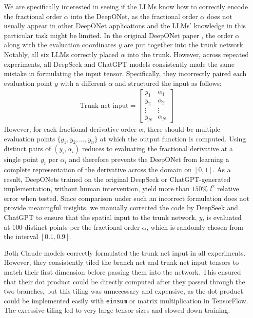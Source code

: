 \documentclass{article}
\begin{document}
We are specifically interested in seeing if the LLMs know how to correctly encode the fractional order $\alpha$ into the DeepONet, as the fractional order $\alpha$ does not usually appear in other DeepONet applications and the LLMs' knowledge in this particular task might be limited. In the original DeepONet paper \cite{deeponet}, the order $\alpha$ along with the evaluation coordinates $y$ are put together into the trunk network. Notably, all six LLMs correctly placed $\alpha$ into the trunk. However, across repeated experiments, all DeepSeek and ChatGPT models consistently made the same mistake in formulating the input tensor. Specifically, they incorrectly paired each evaluation point $y$ with a different $\alpha$ and structured the input as follows:  
\begin{align*}
    \text{Trunk net input} = \begin{bmatrix} 
    y_1 & \alpha_1 \\ 
    y_2 & \alpha_2 \\ 
    \vdots & \vdots \\ 
    y_N & \alpha_N 
    \end{bmatrix}
\end{align*}
However, for each fractional derivative order $\alpha$, there should be multiple evaluation points $\{y_1, y_2, \ldots, y_n\}$ at which the output function is computed. Using distinct pairs of $(y_i, \alpha_i)$ reduces to evaluating the fractional derivative at a single point $y_i$ per $\alpha_i$ and therefore prevents the DeepONet from learning a complete representation of the derivative across the domain on $[0,1]$. As a result, DeepONets trained on the original DeepSeek or ChatGPT-generated implementation, without human intervention, yield more than $150\%$ $l^2$ relative error when tested. Since comparison under such an incorrect formulation does not provide meaningful insights, we manually corrected the code by DeepSeek and ChatGPT to ensure that the spatial input to the trunk network, $y$, is evaluated at 100 distinct points per the fractional order $\alpha$, which is randomly chosen from the interval $[0.1, 0.9]$.

Both Claude models correctly formulated the trunk net input in all experiments. However, they consistently tiled the branch net and trunk net input tensors to match their first dimension before passing them into the network. This ensured that their dot product could be directly computed after they passed through the two branches, but this tiling was unnecessary and expensive, as the dot product could be implemented easily with \texttt{einsum} or matrix multiplication in TensorFlow. The excessive tiling led to very large tensor sizes and slowed down training. 
\end{document}
